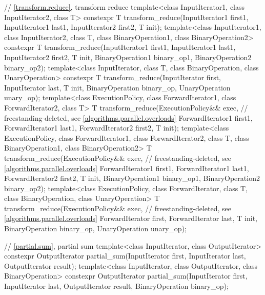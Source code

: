 \begin{codeblock}
{  // \ref{transform.reduce}, transform reduce
  template<class InputIterator1, class InputIterator2, class T>
    constexpr T transform_reduce(InputIterator1 first1, InputIterator1 last1,
                                 InputIterator2 first2, T init);
  template<class InputIterator1, class InputIterator2, class T,
           class BinaryOperation1, class BinaryOperation2>
    constexpr T transform_reduce(InputIterator1 first1, InputIterator1 last1,
                                 InputIterator2 first2, T init,
                                 BinaryOperation1 binary_op1, BinaryOperation2 binary_op2);
  template<class InputIterator, class T,
           class BinaryOperation, class UnaryOperation>
    constexpr T transform_reduce(InputIterator first, InputIterator last, T init,
                                 BinaryOperation binary_op, UnaryOperation unary_op);
  template<class ExecutionPolicy,
           class ForwardIterator1, class ForwardIterator2, class T>
    T transform_reduce(ExecutionPolicy&& exec,                  // freestanding-deleted, see \ref{algorithms.parallel.overloads}
                       ForwardIterator1 first1, ForwardIterator1 last1,
                       ForwardIterator2 first2, T init);
  template<class ExecutionPolicy,
           class ForwardIterator1, class ForwardIterator2, class T,
           class BinaryOperation1, class BinaryOperation2>
    T transform_reduce(ExecutionPolicy&& exec,                  // freestanding-deleted, see \ref{algorithms.parallel.overloads}
                       ForwardIterator1 first1, ForwardIterator1 last1,
                       ForwardIterator2 first2, T init,
                       BinaryOperation1 binary_op1, BinaryOperation2 binary_op2);
  template<class ExecutionPolicy, class ForwardIterator, class T,
           class BinaryOperation, class UnaryOperation>
    T transform_reduce(ExecutionPolicy&& exec,                  // freestanding-deleted, see \ref{algorithms.parallel.overloads}
                       ForwardIterator first, ForwardIterator last, T init,
                       BinaryOperation binary_op, UnaryOperation unary_op);

  // \ref{partial.sum}, partial sum
  template<class InputIterator, class OutputIterator>
    constexpr OutputIterator
      partial_sum(InputIterator first, InputIterator last,
                  OutputIterator result);
  template<class InputIterator, class OutputIterator, class BinaryOperation>
    constexpr OutputIterator
      partial_sum(InputIterator first, InputIterator last,
                  OutputIterator result, BinaryOperation binary_op);

}
\end{codeblock}
